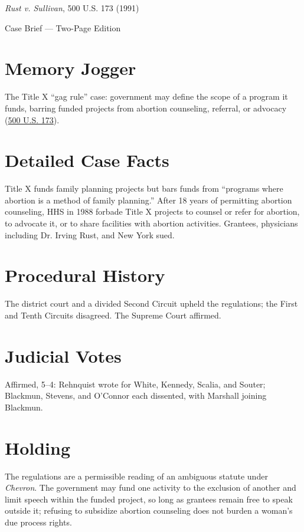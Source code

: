 \documentclass[12pt]{article}
\begin{document}
\begin{center}
{\LARGE \textit{Rust v. Sullivan}, 500 U.S. 173 (1991)\par}
\vspace{0.5em}
{\large Case Brief --- Two-Page Edition\par}
\end{center}

\section{Memory Jogger}
The Title X ``gag rule'' case: government may define the scope of a program it funds, barring funded projects from abortion counseling, referral, or advocacy (\href{https://supreme.justia.com/cases/federal/us/500/173/}{500 U.S. 173}).

\section{Detailed Case Facts}
Title X funds family planning projects but bars funds from ``programs where abortion is a method of family planning.'' After 18 years of permitting abortion counseling, HHS in 1988 forbade Title X projects to counsel or refer for abortion, to advocate it, or to share facilities with abortion activities. Grantees, physicians including Dr. Irving Rust, and New York sued.

\section{Procedural History}
The district court and a divided Second Circuit upheld the regulations; the First and Tenth Circuits disagreed. The Supreme Court affirmed.

\section{Judicial Votes}
Affirmed, 5--4: Rehnquist wrote for White, Kennedy, Scalia, and Souter; Blackmun, Stevens, and O'Connor each dissented, with Marshall joining Blackmun.

\section{Holding}
The regulations are a permissible reading of an ambiguous statute under \textit{Chevron}. The government may fund one activity to the exclusion of another and limit speech within the funded project, so long as grantees remain free to speak outside it; refusing to subsidize abortion counseling does not burden a woman's due process rights.
\end{document}
